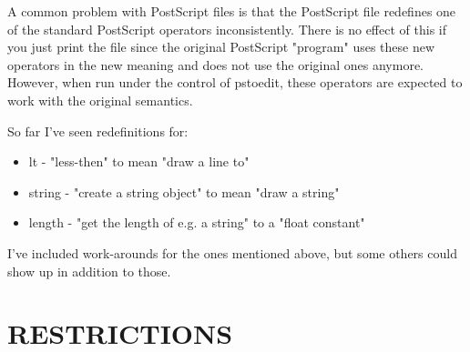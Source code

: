 \documentclass[english,a4paper]{article}
\begin{document}
A common problem with PostScript files is that the PostScript file redefines
one of the standard PostScript operators inconsistently. There is no effect
of this if you just print the file since the original PostScript "program"
uses these new operators in the new meaning and does not use the original
ones anymore. However, when run under the control of pstoedit, these
operators are expected to work with the original semantics.

So far I've seen redefinitions for:

\begin{itemize}

   \item lt - "less-then" to mean "draw a line to"
   \item string - "create a string object" to mean "draw a string"
   \item length - "get the length of e.g. a string" to a "float constant"

\end{itemize}

I've included work-arounds for the ones mentioned above, but some others
could show up in addition to those.


\section{RESTRICTIONS}
\end{document}
